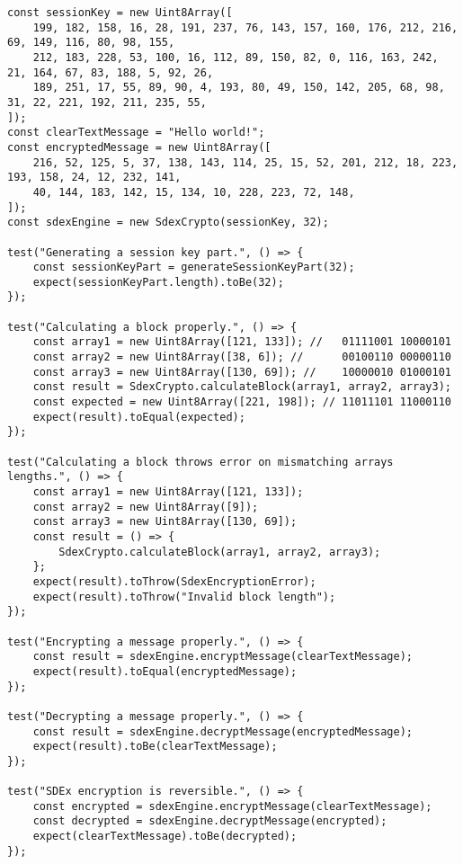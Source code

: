 \documentclass[../main.tex]{subfiles}
\begin{document}
\begin{lstlisting}[caption={Testy jednostkowe sprawdzające implementację algorytmu SDEx},label={lst:sdex_test_suite}]
const sessionKey = new Uint8Array([
    199, 182, 158, 16, 28, 191, 237, 76, 143, 157, 160, 176, 212, 216, 69, 149, 116, 80, 98, 155,
    212, 183, 228, 53, 100, 16, 112, 89, 150, 82, 0, 116, 163, 242, 21, 164, 67, 83, 188, 5, 92, 26,
    189, 251, 17, 55, 89, 90, 4, 193, 80, 49, 150, 142, 205, 68, 98, 31, 22, 221, 192, 211, 235, 55,
]);
const clearTextMessage = "Hello world!";
const encryptedMessage = new Uint8Array([
    216, 52, 125, 5, 37, 138, 143, 114, 25, 15, 52, 201, 212, 18, 223, 193, 158, 24, 12, 232, 141,
    40, 144, 183, 142, 15, 134, 10, 228, 223, 72, 148,
]);
const sdexEngine = new SdexCrypto(sessionKey, 32);

test("Generating a session key part.", () => {
    const sessionKeyPart = generateSessionKeyPart(32);
    expect(sessionKeyPart.length).toBe(32);
});

test("Calculating a block properly.", () => {
    const array1 = new Uint8Array([121, 133]); //   01111001 10000101
    const array2 = new Uint8Array([38, 6]); //      00100110 00000110
    const array3 = new Uint8Array([130, 69]); //    10000010 01000101
    const result = SdexCrypto.calculateBlock(array1, array2, array3);
    const expected = new Uint8Array([221, 198]); // 11011101 11000110
    expect(result).toEqual(expected);
});

test("Calculating a block throws error on mismatching arrays lengths.", () => {
    const array1 = new Uint8Array([121, 133]);
    const array2 = new Uint8Array([9]);
    const array3 = new Uint8Array([130, 69]);
    const result = () => {
        SdexCrypto.calculateBlock(array1, array2, array3);
    };
    expect(result).toThrow(SdexEncryptionError);
    expect(result).toThrow("Invalid block length");
});

test("Encrypting a message properly.", () => {
    const result = sdexEngine.encryptMessage(clearTextMessage);
    expect(result).toEqual(encryptedMessage);
});

test("Decrypting a message properly.", () => {
    const result = sdexEngine.decryptMessage(encryptedMessage);
    expect(result).toBe(clearTextMessage);
});

test("SDEx encryption is reversible.", () => {
    const encrypted = sdexEngine.encryptMessage(clearTextMessage);
    const decrypted = sdexEngine.decryptMessage(encrypted);
    expect(clearTextMessage).toBe(decrypted);
});
\end{lstlisting}
\end{document}
